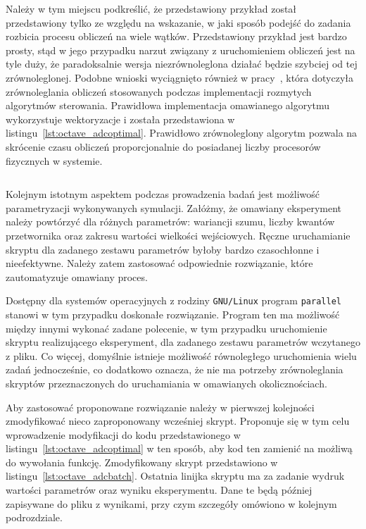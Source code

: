 Należy w tym miejscu podkreślić, że przedstawiony przykład został przedstawiony tylko ze względu na wskazanie, w jaki sposób podejść do zadania rozbicia procesu obliczeń na wiele wątków. Przedstawiony przykład jest bardzo prosty, stąd w jego przypadku narzut związany z uruchomieniem obliczeń jest na tyle duży, że paradoksalnie wersja niezrównoleglona działać będzie szybciej od tej zrównoleglonej. Podobne wnioski wyciągnięto również w pracy~\cite{auth_parallel}, która dotyczyła zrównoleglania obliczeń stosowanych podczas implementacji rozmytych algorytmów sterowania. Prawidłowa implementacja omawianego algorytmu wykorzystuje wektoryzacje i została przedstawiona w listingu~\ref{lst:octave_adcoptimal}. Prawidłowo zrównoleglony algorytm pozwala na skrócenie czasu obliczeń proporcjonalnie do posiadanej liczby procesorów fizycznych w systemie.

\begin{listing}[htb]
\inputminted{octave}{skrypty/octave_adcoptimal.m}
\end{listing}

Kolejnym istotnym aspektem podczas prowadzenia badań jest możliwość parametryzacji wykonywanych symulacji. Załóżmy, że omawiany eksperyment należy powtórzyć dla różnych parametrów: wariancji szumu, liczby kwantów przetwornika oraz zakresu wartości wielkości wejściowych. Ręczne uruchamianie skryptu dla zadanego zestawu parametrów byłoby bardzo czasochłonne i nieefektywne. Należy zatem zastosować odpowiednie rozwiązanie, które zautomatyzuje omawiany proces.

Dostępny dla systemów operacyjnych z rodziny \texttt{GNU/Linux} program \texttt{parallel} stanowi w tym przypadku doskonałe rozwiązanie. Program ten ma możliwość między innymi wykonać zadane polecenie, w tym przypadku uruchomienie skryptu realizującego eksperyment, dla zadanego zestawu parametrów wczytanego z pliku. Co więcej, domyślnie istnieje możliwość równoległego uruchomienia wielu zadań jednocześnie, co dodatkowo oznacza, że nie ma potrzeby zrównoleglania skryptów przeznaczonych do uruchamiania w omawianych okolicznościach.

Aby zastosować proponowane rozwiązanie należy w pierwszej kolejności zmodyfikować nieco zaproponowany wcześniej skrypt. Proponuje się w tym celu wprowadzenie modyfikacji do kodu przedstawionego w listingu~\ref{lst:octave_adcoptimal} w ten sposób, aby kod ten zamienić na możliwą do wywołania funkcję. Zmodyfikowany skrypt przedstawiono w listingu~\ref{lst:octave_adcbatch}. Ostatnia linijka skryptu ma za zadanie wydruk wartości parametrów oraz wyniku eksperymentu. Dane te będą później zapisywane do pliku z wynikami, przy czym szczegóły omówiono w kolejnym podrozdziale.

